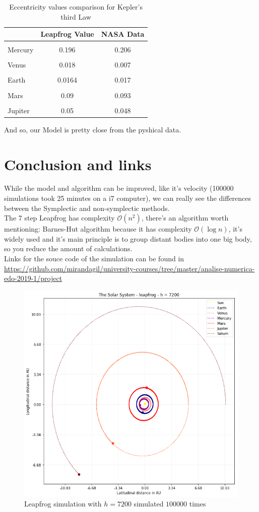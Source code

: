 \documentclass[12pt]{article}
\begin{document}
\begin{table}[H]
\centering
\caption{Eccentricity values comparison for Kepler's third Law}
\label{tab:exTable1}
\smallskip
\begin{tabular}{|l|c|c|}
\hline
& Leapfrog Value & NASA Data\\[0.5ex]
\hline
&&\\[-2ex]
Mercury & 0.196 & 0.206\\[0.5ex]
\hline
&&\\[-2ex]
Venus & 0.018 & 0.007\\[0.5ex]
\hline
&&\\[-2ex]
Earth & 0.0164 & 0.017\\[0.5ex]
\hline
&&\\[-2ex]
Mars & 0.09 & 0.093\\[0.5ex]
\hline
&&\\[-2ex]
Jupiter & 0.05 & 0.048\\[0.5ex]
\hline
\end{tabular}
\end{table}
And so, our Model is pretty close from the pyshical data.
\section{Conclusion and links}
While the model and algorithm can be improved, like it's velocity (100000 simulations took 25 minutes on a i7 computer), we can really see the differences between the Symplectic and non-symplectic methods.\\
The 7 step Leapfrog has complexity \(\mathcal{O}(n^2)\), there's an algorithm worth mentioning: Barnes-Hut algorithm because it has complexity \(\mathcal{O}(\log{}n)\), it's widely used and it's main principle is to group distant bodies into one big body, so you reduce the amount of calculations.\\
Links for the souce code of the simulation can be found in \url{https://github.com/mirandagil/university-courses/tree/master/analise-numerica-edo-2019-1/project}

\begin{figure}[H]
  \includegraphics[width=.7\textwidth, height =.4\textheight]{planets.png}
  \caption{Leapfrog simulation with \( h = 7200 \) simulated \(100000\) times}
  \label{Euler Method}
\end{figure}
\end{document}
